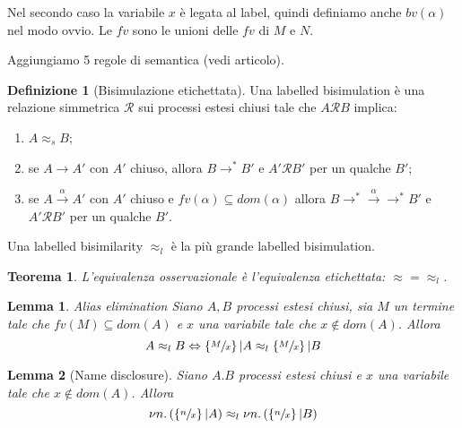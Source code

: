 \documentclass[a4paper,12pt]{article}
\theoremstyle{plain}
\newtheorem{myteo}{Teorema}[section]
\newtheorem{mylem}{Lemma}[section]
\theoremstyle{definition}
\newtheorem{mydef}{Definizione}[section]
\newtheorem{myes}{Esempio}[section]
\theoremstyle{remark}
\newtheorem{myoss}{Osservazione}[section]
\newcommand{\set}[1]{\left\{#1\right\}}
\newcommand{\pa}[1]{\left(#1\right)}
\newcommand{\ang}[1]{\left<#1\right>}
\begin{document}
Nel secondo caso la variabile $x$ \`e legata al label, quindi
definiamo anche $bv(\alpha)$ nel modo ovvio. Le $fv$ sono le unioni
delle $fv$ di $M$ e $N$.

Aggiungiamo 5 regole di semantica (vedi articolo).

\begin{mydef}[Bisimulazione etichettata]
  Una labelled bisimulation \`e una relazione simmetrica $\mathcal{R}$
  sui processi estesi chiusi tale che $A \mathcal{R} B$ implica:
  \begin{enumerate}
  \item $A \approx _s B$;
  \item se $A \rightarrow A'$ con $A'$ chiuso, allora $B \rightarrow
    ^* B'$ e $A' \mathcal{R} B'$ per un qualche $B'$;
  \item se $A \xrightarrow{\alpha} A'$ con $A'$ chiuso e $fv(\alpha)
    \subseteq dom(\alpha)$ allora $B\rightarrow ^*
    \xrightarrow{\alpha} \rightarrow ^* B'$ e $A' \mathcal{R} B'$ per
    un qualche $B'$.
  \end{enumerate}
  Una labelled bisimilarity $\approx _l$ \`e la pi\`u grande labelled
  bisimulation.
\end{mydef}

\begin{myteo}
  L'equivalenza osservazionale \`e l'equivalenza etichettata: $\approx
  = \approx _l$.
\end{myteo}

\begin{mylem}{Alias elimination}
  Siano $A,B$ processi estesi chiusi, sia $M$ un termine tale che
  $fv(M) \subseteq dom(A)$ e $x$ una variabile tale che $x \not\in
  dom(A)$. Allora
  \[ A \approx _l B \Leftrightarrow \set{\sfrac{M}{x}}|A \approx _l
    \set{\sfrac{M}{x}}|B \]
\end{mylem}

\begin{mylem}[Name disclosure]
  Siano $A.B$ processi estesi chiusi e $x$ una variabile tale che $x
  \not\in dom(A)$. Allora
  \[ \nu n. \pa{ \set{\sfrac{n}{x}}|A} \approx _l \nu n. \pa{
      \set{\sfrac{n}{x}}|B } \]  
\end{mylem}
\end{document}
